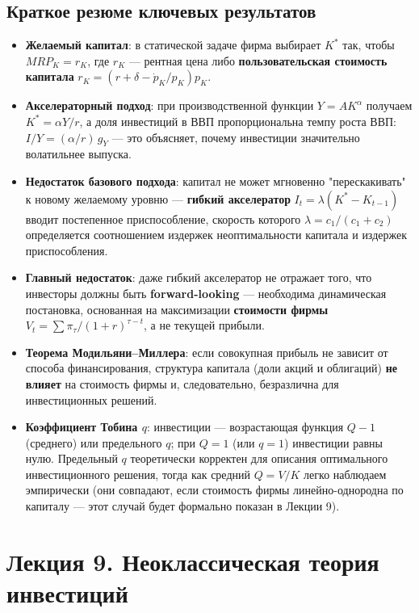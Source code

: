 \documentclass[10pt,a4paper]{article}
\begin{document}
\subsection{Краткое резюме ключевых результатов}

\begin{itemize}[leftmargin=1.3em]
\item \textbf{Желаемый капитал}: в статической задаче фирма выбирает $K^{*}$ так, чтобы $MRP_K=r_K$, где $r_K$ — рентная цена либо \textbf{пользовательская стоимость капитала} $r_K=(r+\delta-\dot p_K/p_K)p_K$.
\item \textbf{Акселераторный подход}: при производственной функции $Y=AK^\alpha$ получаем $K^{*}=\alpha Y/r$, а доля инвестиций в ВВП пропорциональна темпу роста ВВП: $I/Y = (\alpha/r)\,g_Y$ — это объясняет, почему инвестиции значительно волатильнее выпуска.
\item \textbf{Недостаток базового подхода}: капитал не может мгновенно "перескакивать" к новому желаемому уровню — \textbf{гибкий акселератор} $I_t=\lambda(K^{*}-K_{t-1})$ вводит постепенное приспособление, скорость которого $\lambda=c_1/(c_1+c_2)$ определяется соотношением издержек неоптимальности капитала и издержек приспособления.
\item \textbf{Главный недостаток}: даже гибкий акселератор не отражает того, что инвесторы должны быть \textbf{forward-looking} — необходима динамическая постановка, основанная на максимизации \textbf{стоимости фирмы} $V_t=\sum \pi_\tau/(1+r)^{\tau-t}$, а не текущей прибыли.
\item \textbf{Теорема Модильяни--Миллера}: если совокупная прибыль не зависит от способа финансирования, структура капитала (доли акций и облигаций) \textbf{не влияет} на стоимость фирмы и, следовательно, безразлична для инвестиционных решений.
\item \textbf{Коэффициент Тобина $q$}: инвестиции — возрастающая функция $Q-1$ (среднего) или предельного $q$; при $Q=1$ (или $q=1$) инвестиции равны нулю. Предельный $q$ теоретически корректен для описания оптимального инвестиционного решения, тогда как средний $Q=V/K$ легко наблюдаем эмпирически (они совпадают, если стоимость фирмы линейно-однородна по капиталу — этот случай будет формально показан в Лекции 9).
\end{itemize}

\newpage
\section{Лекция 9. Неоклассическая теория инвестиций}
\end{document}
